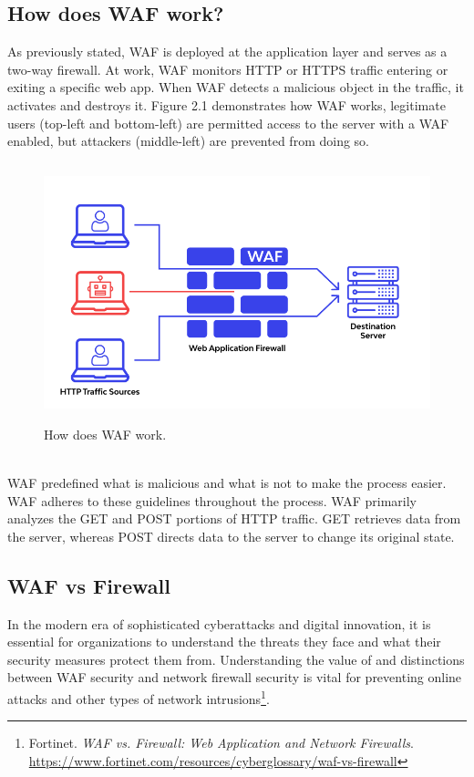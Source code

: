 \subsection{How does WAF work?}
\label{subsec:waf_work}
As previously stated, WAF is deployed at the application layer and serves as a two-way firewall. At work, WAF monitors HTTP or HTTPS traffic entering or exiting a specific web app. When WAF detects a malicious object in the traffic, it activates and destroys it. Figure 2.1 demonstrates how WAF works, legitimate users (top-left and bottom-left) are permitted access to the server with a WAF enabled, but attackers (middle-left) are prevented from doing so.
\begin{figure}[!h]
   
	\centering
	\includegraphics[width=\linewidth, height=7.5cm,keepaspectratio]{figures/wallarmwaf.png}
	\caption{How does WAF work.}\label{Fig:Data1}
  
\end{figure}
\\
WAF predefined what is malicious and what is not to make the process easier. WAF adheres to these guidelines throughout the process. WAF primarily analyzes the GET and POST portions of HTTP traffic. GET retrieves data from the server, whereas POST directs data to the server to change its original state.
\subsection{WAF vs Firewall}
\label{subsec:versus}
In the modern era of sophisticated cyberattacks and digital innovation, it is essential for organizations to understand the threats they face and what their security measures protect them from. Understanding the value of and distinctions between WAF security and network firewall security is vital for preventing online attacks and other types of network intrusions\footnote{Fortinet. \textit{WAF vs. Firewall: Web Application and Network Firewalls}. 
\url{https://www.fortinet.com/resources/cyberglossary/waf-vs-firewall}}.

